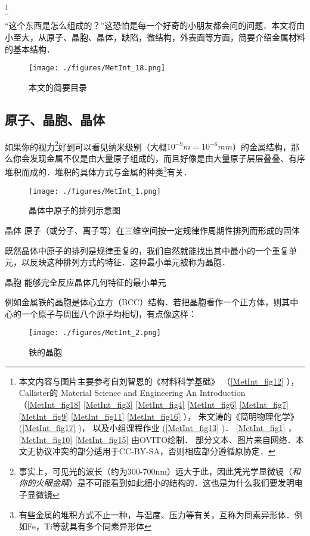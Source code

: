 
\footnote{本文内容与图片主要参考自刘智恩的《材料科学基础》
（\autoref{MetInt_fig12} ），
Callister的 Material Science and Engineering An Introduction
（\autoref{MetInt_fig18}  \autoref{MetInt_fig3} \autoref{MetInt_fig4} \autoref{MetInt_fig6} \autoref{MetInt_fig7} \autoref{MetInt_fig9} \autoref{MetInt_fig11} \autoref{MetInt_fig16} ），
朱文涛的《简明物理化学》
(\autoref{MetInt_fig17} )，
以及小组课程作业
(\autoref{MetInt_fig13} )． 
\autoref{MetInt_fig1} ，\autoref{MetInt_fig10} \autoref{MetInt_fig15} 由OVITO绘制．
部分文本、图片来自网络．本文无协议冲突的部分适用于CC-BY-SA，否则相应部分遵循原协定．}

“这个东西是怎么组成的？”这恐怕是每一个好奇的小朋友都会问的问题．本文将由小至大，从原子、晶胞、晶体，缺陷，微结构，外表面等方面，简要介绍金属材料的基本结构．
\begin{figure}[ht]
\centering
\texttt{[image: ./figures/MetInt\_18.png]}
\caption{本文的简要目录} \label{MetInt_fig18}
\end{figure}

\subsection{原子、晶胞、晶体}
如果你的视力\footnote{事实上，可见光的波长（约为300-700nm）远大于此，因此凭光学显微镜（\textsl{和你的火眼金睛}）是不可能看到如此细小的结构的．这也是为什么我们要发明电子显微镜}好到可以看见纳米级别（大概$10^{-9}m =10^{-6} mm$）的金属结构，那么你会发现金属不仅是由大量原子组成的，而且好像是由大量原子层层叠叠、有序堆积而成的．堆积的具体方式与金属的种类\footnote{有些金属的堆积方式不止一种，与温度、压力等有关，互称为同素异形体．例如Fe，Ti等就具有多个同素异形体}有关．

\begin{figure}[ht]
\centering
\texttt{[image: ./figures/MetInt\_1.png]}
\caption{晶体中原子的排列示意图} \label{MetInt_fig1}
\end{figure}

\begin{definition}{晶体}
原子（或分子、离子等）在三维空间按一定规律作周期性排列而形成的固体
\end{definition}

既然晶体中原子的排列是规律重复的，我们自然就能找出其中最小的一个重复单元，以反映这种排列方式的特征．这种最小单元被称为晶胞．
\begin{definition}{晶胞}
能够完全反应晶体几何特征的最小单元
\end{definition}
例如金属铁的晶胞是体心立方（BCC）结构．若把晶胞看作一个正方体，则其中心的一个原子与周围八个原子均相切，有点像这样：
\begin{figure}[ht]
\centering
\texttt{[image: ./figures/MetInt\_2.png]}
\caption{铁的晶胞} \label{MetInt_fig2}
\end{figure}

